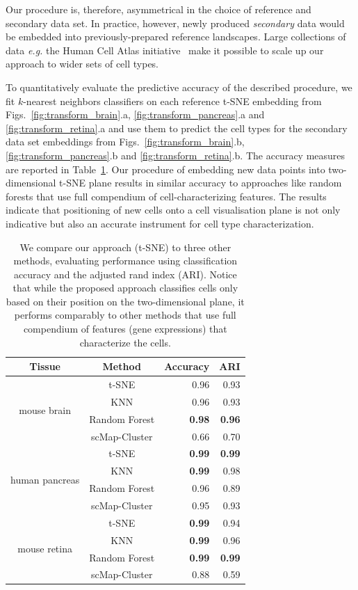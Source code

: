 \documentclass[runningheads]{llncs}
\begin{document}
Our procedure is, therefore, asymmetrical in the choice of reference and secondary data set.
In practice, however, newly produced {\em secondary} data would be embedded into previously-prepared reference landscapes. Large collections of data {\em e.g.} the
Human Cell Atlas initiative~\cite{Rozenblatt-Rosen2017} make it possible to scale up our approach to wider sets of cell types.


To quantitatively evaluate the predictive accuracy of the described procedure, we fit $k$-nearest neighbors classifiers on each reference t-SNE embedding from Figs.~\ref{fig:transform_brain}.a, \ref{fig:transform_pancreas}.a and \ref{fig:transform_retina}.a and use them to predict the cell types for the secondary data set embeddings from Figs.~\ref{fig:transform_brain}.b, \ref{fig:transform_pancreas}.b and \ref{fig:transform_retina}.b. The accuracy measures are reported in Table~\ref{tab:scores}. Our procedure of embedding new data points into two-dimensional t-SNE plane results in similar accuracy to approaches like random forests that use full compendium of cell-characterizing features. The results indicate that positioning of new cells onto a cell visualisation plane is not only indicative but also an accurate instrument for cell type characterization.

\begin{table}[ht]
\centering
  \setlength\tabcolsep{6pt}
  \begin{tabular}{c c r r}
  \toprule
  Tissue & Method & Accuracy & ARI \\
  \toprule
  \multirow{4}{*}{mouse brain} & t-SNE & 0.96 & 0.93 \\
   & KNN & 0.96 & 0.93 \\
   & Random Forest & \textbf{0.98} & \textbf{0.96} \\
   & scMap-Cluster & 0.66 & 0.70 \\
  \midrule
  \multirow{4}{*}{human pancreas} & t-SNE & \textbf{0.99} & \textbf{0.99} \\
   & KNN & \textbf{0.99} & 0.98 \\
   & Random Forest & 0.96 & 0.89 \\
   & scMap-Cluster & 0.95 & 0.93 \\
  \midrule
  \multirow{4}{*}{mouse retina} & t-SNE & \textbf{0.99} & 0.94 \\
   & KNN & \textbf{0.99} & 0.96 \\
   & Random Forest & \textbf{0.99} & \textbf{0.99} \\
   & scMap-Cluster & 0.88 & 0.59 \\
  \bottomrule
  \end{tabular}
  \caption{We compare our approach (t-SNE) to three other methods, evaluating performance using classification accuracy and the adjusted rand index (ARI). Notice that while the proposed approach classifies cells only based on their position on the two-dimensional plane, it performs comparably to other methods that use full compendium of features (gene expressions) that characterize the cells.}
  \label{tab:scores}
\end{table}
\end{document}
